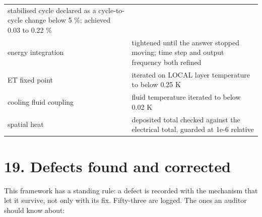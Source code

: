 \documentclass[10pt,]{article}
\begin{document}
\begin{longtable}[]{@{}ll@{}}
\begin{minipage}[t]{0.47\columnwidth}
stabilised cycle declared as a cycle-to-cycle change below 5 \%;
achieved 0.03 to 0.22 \%\strut
\end{minipage}\tabularnewline
\begin{minipage}[t]{0.47\columnwidth}\raggedright
energy integration\strut
\end{minipage} & \begin{minipage}[t]{0.47\columnwidth}\raggedright
tightened until the answer stopped moving; time step and output
frequency both refined\strut
\end{minipage}\tabularnewline
\begin{minipage}[t]{0.47\columnwidth}\raggedright
ET fixed point\strut
\end{minipage} & \begin{minipage}[t]{0.47\columnwidth}\raggedright
iterated on LOCAL layer temperature to below 0.25 K\strut
\end{minipage}\tabularnewline
\begin{minipage}[t]{0.47\columnwidth}\raggedright
cooling fluid coupling\strut
\end{minipage} & \begin{minipage}[t]{0.47\columnwidth}\raggedright
fluid temperature iterated to below 0.02 K\strut
\end{minipage}\tabularnewline
\begin{minipage}[t]{0.47\columnwidth}\raggedright
spatial heat\strut
\end{minipage} & \begin{minipage}[t]{0.47\columnwidth}\raggedright
deposited total checked against the electrical total, guarded at 1e-6
relative\strut
\end{minipage}\tabularnewline
\bottomrule
\end{longtable}

\newpage

\hypertarget{defects-found-and-corrected}{%
\section{19. Defects found and
corrected}\label{defects-found-and-corrected}}

This framework has a standing rule: a defect is recorded with the
mechanism that let it survive, not only with its fix. Fifty-three are
logged. The ones an auditor should know about:
\end{document}
